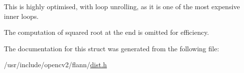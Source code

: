 This is highly optimised, with loop unrolling, as it is one of the most expensive inner loops.

The computation of squared root at the end is omitted for efficiency. 

The documentation for this struct was generated from the following file\-:\begin{DoxyCompactItemize}
\item 
/usr/include/opencv2/flann/\hyperlink{dist_8h}{dist.\-h}\end{DoxyCompactItemize}
